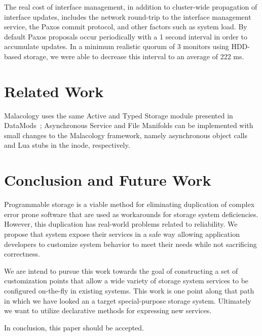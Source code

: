 \documentclass[10pt,twocolumn]{article}
\begin{document}
The real cost of interface management, in addition to cluster-wide propagation
of interface updates, includes the network round-trip to the interface
management service, the Paxos commit protocol, and other factors such as system
load. By default Paxos proposals occur periodically with a 1 second interval in
order to accumulate updates. In a minimum realistic quorum of 3 monitors using
HDD-based storage, we were able to decrease this interval to an average of 222
ms.

%
%
%

\section{Related Work}

Malacology uses the same Active and Typed Storage module presented in
DataMods~\cite{watkins_datamods_2012}; Asynchronous Service and File
Manifolds can be implemented with small changes to the Malacology
framework, namely asynchronous object calls and Lua stubs in the inode,
respectively.


\section{Conclusion and Future Work}\label{conclusion-and-future-work}

Programmable storage is a viable method for eliminating duplication of
complex error prone software that are used as workarounds for storage
system deficiencies. However, this duplication has real-world problems
related to reliability. We propose that system expose their services in
a safe way allowing application developers to customize system behavior
to meet their needs while not sacrificing correctness.

We are intend to pursue this work towards the goal of constructing a set
of customization points that allow a wide variety of storage system
services to be configured on-the-fly in existing systems. This work is
one point along that path in which we have looked an a target
special-purpose storage system. Ultimately we want to utilize
declarative methods for expressing new services.

In conclusion, this paper should be accepted.



\end{document}

